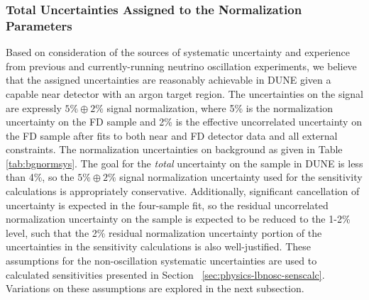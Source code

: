 \subsubsection{Total Uncertainties Assigned to the Normalization Parameters}
Based on consideration of the sources of systematic uncertainty 
and experience from previous and currently-running neutrino oscillation
experiments, we believe that the assigned uncertainties are reasonably achievable in DUNE given a capable near detector with an argon target region.
The uncertainties on the signal are expressly $5\% \oplus 2\%$ signal normalization, where 5\% is the normalization uncertainty on the
FD \numu sample and 2\% is the effective uncorrelated uncertainty on the FD \nue sample after fits to both near
and FD detector data and all external constraints. The normalization uncertainties on background as given
in Table \ref{tab:bgnormsys}.
The goal for the \emph{total} uncertainty on the \nue sample in
DUNE is less than 4\%, so the $5\% \oplus 2\%$ \nue signal normalization uncertainty
used for the sensitivity calculations is appropriately conservative.
Additionally, significant cancellation of uncertainty is expected in the four-sample fit, so the
residual uncorrelated normalization uncertainty on the \nue sample is expected to be reduced to the 1-2\% level,
such that the 2\% residual normalization uncertainty portion of the uncertainties in the sensitivity calculations
is also well-justified. These assumptions for the non-oscillation systematic uncertainties 
are used to calculated sensitivities presented in Section ~\ref{sec:physics-lbnosc-senscalc}.
Variations on these assumptions are explored in the next subsection.

